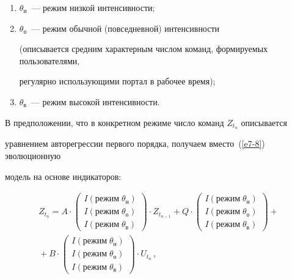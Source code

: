       \begin{enumerate}[(1)]


\item $\theta_{\mathrm{н}}$~--- режим низкой интенсивности;


\item $\theta_{\mathrm{о}}$~--- режим обычной (повседневной) интенсивности 


(описывается средним характерным числом команд, фор\-ми\-ру\-емых пользователями, 


регулярно использующими портал в рабочее время);


\item $\theta_{\mathrm{в}}$~--- режим высокой интенсивности.


\end{enumerate}





      В предположении, что в конкретном режиме число команд $Z_{t_n}$ описывается 


уравнением авторегрессии первого порядка, получаем вместо~(\ref{e7-8}) эволюционную 


модель на основе индикаторов:


      \begin{multline}


      Z_{t_n} =A\cdot \begin{pmatrix}


      I(\mbox{режим}\; \theta_{\mathrm{н}})\\


      I(\mbox{режим}\; \theta_{\mathrm{о}})\\


      I(\mbox{режим}\; \theta_{\mathrm{в}})


      \end{pmatrix}\cdot Z_{t_{n-1}}+ 


      Q\cdot\begin{pmatrix}


      I(\mbox{режим}\; \theta_{\mathrm{н}})\\


      I(\mbox{режим}\; \theta_{\mathrm{о}})\\


      I(\mbox{режим}\; \theta_{\mathrm{в}})


      \end{pmatrix}+{}\\


      {}+B\cdot 


      \begin{pmatrix}


      I(\mbox{режим}\; \theta_{\mathrm{н}})\\


      I(\mbox{режим}\; \theta_{\mathrm{о}})\\


      I(\mbox{режим}\; \theta_{\mathrm{в}})


      \end{pmatrix}\cdot U_{t_n}\,,


      \label{e8-8}


      \end{multline}


